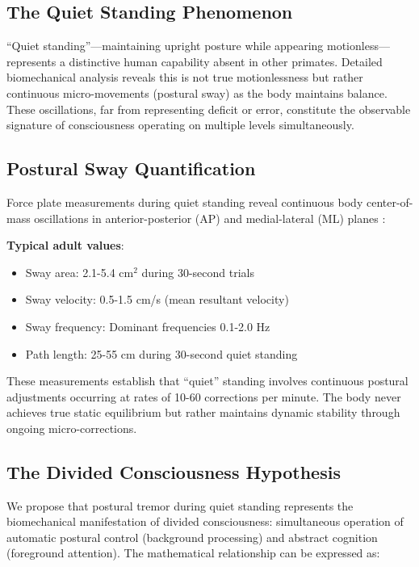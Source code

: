 \subsection{The Quiet Standing Phenomenon}

``Quiet standing''—maintaining upright posture while appearing motionless—represents a distinctive human capability absent in other primates. Detailed biomechanical analysis reveals this is not true motionlessness but rather continuous micro-movements (postural sway) as the body maintains balance. These oscillations, far from representing deficit or error, constitute the observable signature of consciousness operating on multiple levels simultaneously.

\subsection{Postural Sway Quantification}

Force plate measurements during quiet standing reveal continuous body center-of-mass oscillations in anterior-posterior (AP) and medial-lateral (ML) planes \citep{winter1995human}:

\textbf{Typical adult values}:
\begin{itemize}
\item Sway area: 2.1-5.4 cm$^2$ during 30-second trials
\item Sway velocity: 0.5-1.5 cm/s (mean resultant velocity)
\item Sway frequency: Dominant frequencies 0.1-2.0 Hz
\item Path length: 25-55 cm during 30-second quiet standing
\end{itemize}

These measurements establish that ``quiet'' standing involves continuous postural adjustments occurring at rates of 10-60 corrections per minute. The body never achieves true static equilibrium but rather maintains dynamic stability through ongoing micro-corrections.

\subsection{The Divided Consciousness Hypothesis}

We propose that postural tremor during quiet standing represents the biomechanical manifestation of divided consciousness: simultaneous operation of automatic postural control (background processing) and abstract cognition (foreground attention). The mathematical relationship can be expressed as:

